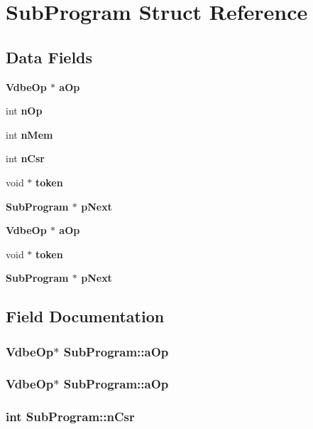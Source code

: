 \section{Sub\-Program Struct Reference}
\label{structSubProgram}
\subsection*{Data Fields}
\begin{CompactItemize}
\item 
\bf{Vdbe\-Op} $\ast$ \bf{a\-Op}
\item 
int \bf{n\-Op}
\item 
int \bf{n\-Mem}
\item 
int \bf{n\-Csr}
\item 
void $\ast$ \bf{token}
\item 
\bf{Sub\-Program} $\ast$ \bf{p\-Next}
\item 
\bf{Vdbe\-Op} $\ast$ \bf{a\-Op}
\item 
void $\ast$ \bf{token}
\item 
\bf{Sub\-Program} $\ast$ \bf{p\-Next}
\end{CompactItemize}


\subsection{Field Documentation}
\subsubsection{\setlength{\rightskip}{0pt plus 5cm}\bf{Vdbe\-Op}$\ast$ \bf{Sub\-Program::a\-Op}}\label{structSubProgram_45cd5fcde28234f26b7b67bcfce33254}


\subsubsection{\setlength{\rightskip}{0pt plus 5cm}\bf{Vdbe\-Op}$\ast$ \bf{Sub\-Program::a\-Op}}\label{structSubProgram_45cd5fcde28234f26b7b67bcfce33254}


\subsubsection{\setlength{\rightskip}{0pt plus 5cm}int \bf{Sub\-Program::n\-Csr}}\label{structSubProgram_34166c586a23a5f84d2614b168474c9d}


